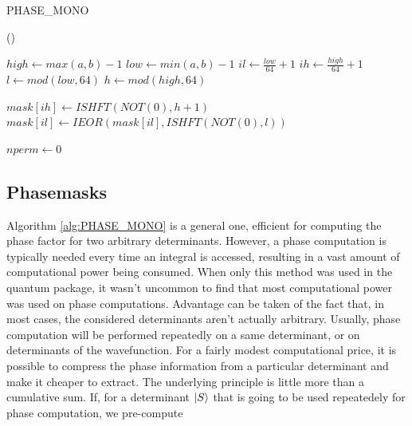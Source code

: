 \documentclass[./thesis.tex]{subfiles}
\begin{document}
\begin{algorithm}
	\caption{PHASE\_MONO}	
	\label{alg:PHASE_MONO}
	
	\Fn(){}{
		$high \gets max(a,b)-1$ \;
		$low \gets min(a,b)-1$ \;
		$il \gets \frac{low}{64} + 1$ \;
		$ih \gets \frac{high}{64} + 1$ \;
		$l \gets mod(low, 64)$ \;
		$h \gets mod(high, 64)$ \; 

		
		$mask[ih] \gets ISHFT(NOT(0), h+1)$ \;
		$mask[il] \gets IEOR(mask[il], ISHFT(NOT(0), l))$ \;
		
		
		$nperm \gets 0$ \;
		}
\end{algorithm}
        

\subsection{Phasemasks}


Algorithm \ref{alg:PHASE_MONO} is a general one, efficient for computing the phase factor for two arbitrary determinants. However, a phase computation is typically needed every time an integral is accessed, resulting in a vast amount of computational power being consumed. When only this method was used in the quantum package, it wasn't uncommon to find that most computational power was used on phase computations.
Advantage can be taken of the fact that, in most cases, the considered determinants aren't actually arbitrary. Usually, phase computation will be performed repeatedly on a same determinant, or on determinants of the wavefunction. For a fairly modest computational price, it is possible to compress the phase information from a particular determinant and make it cheaper to extract. The underlying principle is little more than a cumulative sum. If, for a determinant $\ket S$ that is going to be used repeatedely for phase computation, we pre-compute
        
\end{document}
